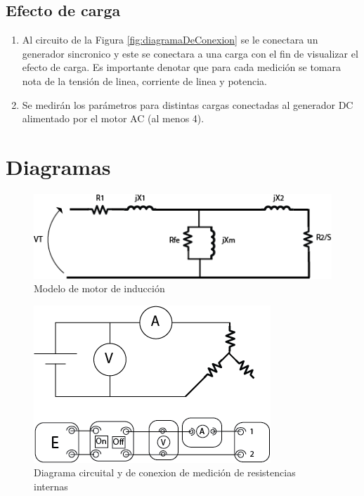 \documentclass[11pt,letterpaper]{article}     %
\begin{document}
\subsection{Efecto de carga}
\begin{enumerate}
	\item Al circuito de la Figura \ref{fig:diagramaDeConexion} se le conectara un generador sincronico y este se conectara a una carga con el fin de visualizar el efecto de carga. Es importante denotar que para cada medición se tomara nota de la tensión  de linea, corriente de linea y potencia.
	\item Se medirán los parámetros para distintas cargas conectadas al generador DC alimentado por el motor AC (al menos 4).
\end{enumerate}
\section{Diagramas}

	\begin{figure}[H]
	\centering
	\includegraphics[scale=0.8]{./recursos-Lab8/modeloInternoMotorInduccion.png}
	\caption{Modelo de motor de inducción}
	\label{fig:modeloMotorInduccion}
\end{figure}

\begin{figure}[H]
	\centering
	\includegraphics[scale=0.8]{./recursos-Lab8/diagramaConexionMedicionResistencia.png}
	\caption{Diagrama circuital y de conexion de medición de resistencias internas}
	\label{fig:modeloConexionResistencias}
\end{figure}
\end{document}
